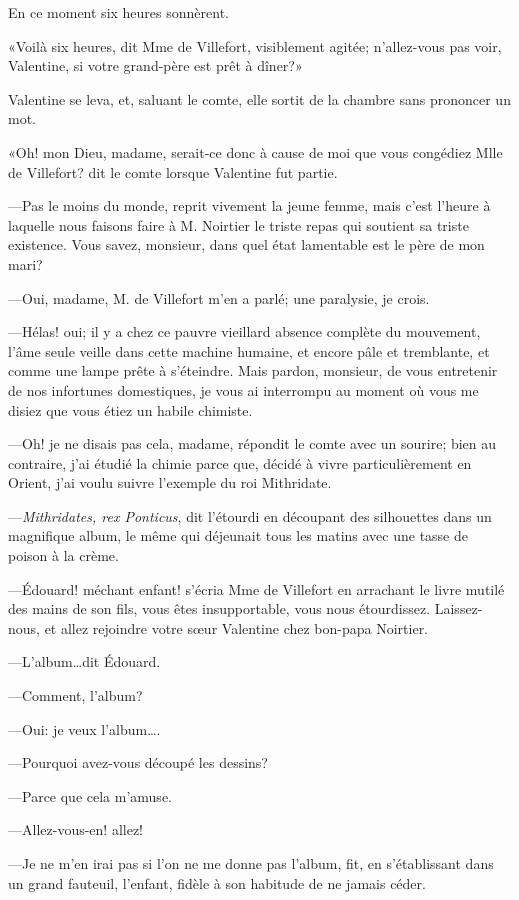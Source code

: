 En ce moment six heures sonnèrent. 

«Voilà six heures, dit Mme de Villefort, visiblement agitée; n'allez-vous pas voir, Valentine, si votre grand-père est prêt à dîner?» 

Valentine se leva, et, saluant le comte, elle sortit de la chambre sans prononcer un mot. 

«Oh! mon Dieu, madame, serait-ce donc à cause de moi que vous congédiez Mlle de Villefort? dit le comte lorsque Valentine fut partie. 

—Pas le moins du monde, reprit vivement la jeune femme, mais c'est l'heure à laquelle nous faisons faire à M. Noirtier le triste repas qui soutient sa triste existence. Vous savez, monsieur, dans quel état lamentable est le père de mon mari? 

—Oui, madame, M. de Villefort m'en a parlé; une paralysie, je crois. 

—Hélas! oui; il y a chez ce pauvre vieillard absence complète du mouvement, l'âme seule veille dans cette machine humaine, et encore pâle et tremblante, et comme une lampe prête à s'éteindre. Mais pardon, monsieur, de vous entretenir de nos infortunes domestiques, je vous ai interrompu au moment où vous me disiez que vous étiez un habile chimiste. 

—Oh! je ne disais pas cela, madame, répondit le comte avec un sourire; bien au contraire, j'ai étudié la chimie parce que, décidé à vivre particulièrement en Orient, j'ai voulu suivre l'exemple du roi Mithridate. 

—\textit{Mithridates, rex Ponticus}, dit l'étourdi en découpant des silhouettes dans un magnifique album, le même qui déjeunait tous les matins avec une tasse de poison à la crème. 

—Édouard! méchant enfant! s'écria Mme de Villefort en arrachant le livre mutilé des mains de son fils, vous êtes insupportable, vous nous étourdissez. Laissez-nous, et allez rejoindre votre sœur Valentine chez bon-papa Noirtier. 

—L'album\dots dit Édouard. 

—Comment, l'album? 

—Oui: je veux l'album\dots. 

—Pourquoi avez-vous découpé les dessins? 

—Parce que cela m'amuse. 

—Allez-vous-en! allez! 

—Je ne m'en irai pas si l'on ne me donne pas l'album, fit, en s'établissant dans un grand fauteuil, l'enfant, fidèle à son habitude de ne jamais céder. 

